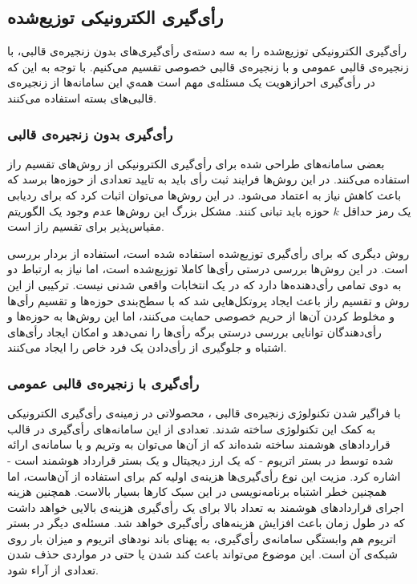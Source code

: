 \subsection{رأی‌گیری الکترونیکی توزیع‌شده}
رأی‌گیری الکترونیکی توزیع‌شده را به سه دسته‌ی رأی‌گیری‌های بدون زنجیره‌ی قالبی، با زنجیره‌ی قالبی عمومی و با زنجیره‌ی قالبی خصوصی تقسیم می‌کنیم. با توجه به این که در رأی‌گیری احرازهویت یک مسئله‌ی مهم است همه‌ي این سامانه‌ها از زنجیره‌ی قالبی‌های بسته استفاده می‌کنند.
\subsubsection{رأی‌گیری بدون زنجیره‌ی قالبی} 
بعضی سامانه‌های طراحی شده برای رأی‌گیری الکترونیکی
\cite{secret1}
\cite{secret2}
\cite{secret3}
از روش‌های تقسیم راز
استفاده می‌کنند. در این روش‌ها فرایند ثبت رأی باید به تایید تعدادی از حوزه‌ها برسد که باعث کاهش نیاز به اعتماد می‌شود. در این روش‌ها می‌توان اثبات کرد که برای ردیابی یک رمز حداقل $k$ حوزه باید تبانی کنند. مشکل بزرگ این روش‌ها عدم وجود یک الگوریتم مقیاس‌پذیر برای تقسیم راز است.
\par
روش دیگری که برای رأی‌گیری توزیع‌شده استفاده شده است، استفاده از بردار‌ بررسی
\cite{checkvector}
است. در این روش‌ها بررسی درستی رأی‌ها کاملا توزیع‌شده‌ است، اما نیاز به ارتباط دو به دوی تمامی رأی‌دهنده‌ها دارد که در یک انتخابات واقعی شدنی نیست. ترکیبی از این روش و تقسیم راز باعث ایجاد پروتکل‌هایی
\cite{MPO1} \cite{evotinwocrypto}
شد که با سطح‌بندی حوزه‌ها و تقسیم رأی‌ها و مخلوط کردن آن‌ها از حریم خصوصی حمایت می‌کنند، اما این روش‌ها به حوزه‌ها و رأی‌دهندگان توانایی بررسی درستی برگه رأی‌ها را نمی‌دهد و امکان ایجاد رأی‌های اشتباه و جلوگیری از رأی‌دادن یک فرد خاص را ایجاد می‌کنند. 


\subsubsection{رأی‌گیری با زنجیره‌ی قالبی عمومی}
با فراگیر شدن تکنولوژی زنجیره‌ی قالبی
\cite{rosgood}
، محصولاتی در زمینه‌ی رأی‌گیری الکترونیکی به کمک این تکنولوژی ساخته شدند. تعدادی از این سامانه‌های رأی‌گیری در قالب قرارداد‌های هوشمند
\cite{SmartContract}
ساخته‌ شده‌اند که از آن‌ها می‌توان به وتریم 
\cite{votereum}
و یا سامانه‌ی ارائه شده توسط
\cite{yavuz}
در بستر اتریوم
\cite{Ethereum}
- که یک ارز دیجیتال و یک بستر قرارداد هوشمند است - 
اشاره کرد. مزیت این نوع رأی‌گیری‌ها هزینه‌ی اولیه کم برای استفاده از آن‌هاست، اما همچنین خطر اشتباه برنامه‌نویسی
\cite{surveyAtt}
\cite{gyges} \cite{smart}
در این سبک کارها بسیار بالاست. همچنین هزینه اجرای قراردادهای هوشمند به تعداد بالا برای یک رأی‌گیری هزینه‌ی بالایی خواهد داشت که در طول زمان باعث افزایش هزینه‌های رأی‌گیری خواهد شد. مسئله‌ی دیگر در بستر اتریوم هم وابستگی سامانه‌ی رأی‌گیری، به پهنای باند نود‌های اتریوم و میزان بار روی شبکه‌ی آن است. این موضوع می‌تواند باعث کند شدن یا حتی در مواردی حذف شدن تعدادی از آراء شود.

